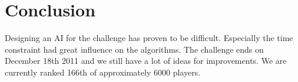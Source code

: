 \section{Conclusion}
Designing an AI for the challenge has proven to be difficult. Especially the time constraint had great influence on the algorithms. The challenge ends on December 18th 2011 and we still have a lot of ideas for improvements. We are currently ranked 166th of approximately 6000 players.